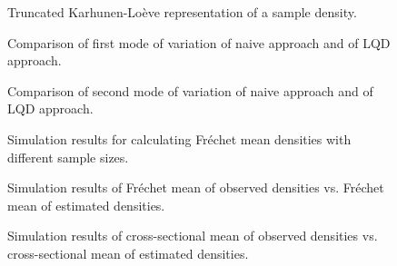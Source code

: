 \begin{figure}[h]
    \centering
    \resizebox{0.9\textwidth}{!}{}
    \caption[Truncated representation --- LQD method]{Truncated Karhunen-Loève
    representation of a sample density.}
    \label{fig:trunc_rep}
\end{figure}

\begin{figure}[h]
    \centering
    \resizebox{0.9\textwidth}{!}{}
    \caption[Comparison: first mode of variation]{Comparison of first mode of variation
    of naive approach and of LQD approach.}
    \label{fig:1st_modes}
\end{figure}

\begin{figure}[h]
    \centering
    \resizebox{0.9\textwidth}{!}{}
    \caption[Comparison: second mode of variation]{Comparison of second mode of variation
    of naive approach and of LQD approach.}
    \label{fig:2nd_modes}
\end{figure}

\begin{figure}[h]
    \centering
    \resizebox{0.9\textwidth}{!}{}
    \caption[Simulation results: average Fréchet means]{Simulation results for calculating
    Fréchet mean densities with different sample sizes.}
    \label{fig:sim_f_mean}
\end{figure}

\begin{figure}[h]
    \centering
    
    \caption[Simulation results: observed vs estimated densities --- Fréchet mean]{Simulation
    results of Fréchet mean of observed densities vs. Fréchet mean of estimated densities.}
    \label{fig:sim_f_denstimation}
\end{figure}

\begin{figure}[h]
    \centering
    \resizebox{0.9\textwidth}{!}{}
    \caption[Simulation results: observed vs estimated densities --- cross-sectional mean]{Simulation
    results of cross-sectional mean of observed densities vs. cross-sectional mean of
    estimated densities.}
    \label{fig:sim_cs_denstimation}
\end{figure}


